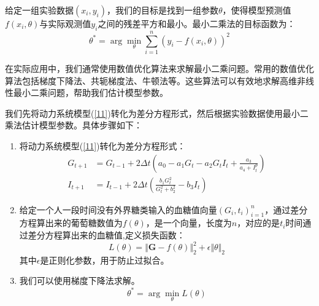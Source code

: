 \begin{defn}[最小二乘法]
    给定一组实验数据$(x_i, y_i)$，我们的目标是找到一组参数$\theta$，使得模型预测值$f(x_i, \theta)$与实际观测值$y_i$之间的残差平方和最小。最小二乘法的目标函数为：
    \begin{equation}
        \theta^* = \arg\min_{\theta} \sum_{i=1}^{n} (y_i - f(x_i, \theta))^2
    \end{equation}
\end{defn}

在实际应用中，我们通常使用数值优化算法来求解最小二乘问题。常用的数值优化算法包括梯度下降法、共轭梯度法、牛顿法等。这些算法可以有效地求解高维非线性最小二乘问题，帮助我们估计模型参数。

我们先将动力系统模型(\ref{11})转化为差分方程形式，然后根据实验数据使用最小二乘法估计模型参数。具体步骤如下：

\begin{enumerate}
    \item 将动力系统模型(\ref{11})转化为差分方程形式：
          \begin{equation}
              \begin{aligned}
                  G_{t+1} & = G_{t-1} + 2\Delta t \left(a_0-a_1G_t-a_2G_tI_t+\frac{a_3}{a_4+I_t^p}\right) \\
                  I_{t+1} & = I_{t-1} + 2\Delta t \left(\frac{b_1 G_t^2}{G_t^2 + b_2^2} - b_3 I_t\right)
              \end{aligned}
          \end{equation}
    \item 给定一个人一段时间没有外界糖类输入的血糖值向量$(G_i,t_i)_{i=1}^n$，通过差分方程算出来的葡萄糖数值为$f(\theta)$，是一个向量，长度为$n$，对应的是$t_i$时间通过差分方程算出来的血糖值,定义损失函数：
          \begin{equation}
              L(\theta) = \Vert\mathbf{G}-f(\theta) \Vert_2^2+\epsilon\Vert \theta \Vert_2
          \end{equation}
          其中$\epsilon$是正则化参数，用于防止过拟合。
    \item 我们可以使用梯度下降法求解。
          \begin{equation}
              \theta^* = \arg\min_{\theta} L(\theta)
          \end{equation}
\end{enumerate}